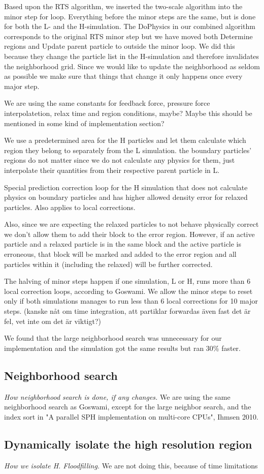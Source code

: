 \documentclass[../../main.tex]{subfiles}
\begin{document}
Based upon the RTS algorithm, we inserted the two-scale algorithm into the minor step for loop. Everything before the minor steps are the same, but is done for both the L- and the H-simulation. The DoPhysics in our combined algorithm corresponds to the original RTS minor step but we have moved both Determine regions and Update parent particle to outside the minor loop. We did this because they change the particle list in the H-simulation and therefore invalidates the neighborhood grid. Since we would like to update the neighborhood as seldom as possible we make sure that things that change it only happens once every major step. 

We are using the same constants for feedback force, pressure force interpolatetion, relax time and region conditions, maybe? Maybe this should be mentioned in some kind of implementation section?

We use a predetermined area for the H particles and let them calculate which region they belong to separately from the L simulation. the boundary particles' regions do not matter since we do not calculate any physics for them, just interpolate their quantities from their respective parent particle in L. 

Special prediction correction loop for the H simulation that does not calculate physics on boundary particles and has higher allowed density error for relaxed particles. Also applies to local corrections. 

Also, since we are expecting the relaxed particles to not behave physically correct we don't allow them to add their block to the error region. However, if an active particle and a relaxed particle is in the same block and the active particle is erroneous, that block will be marked and added to the error region and all particles within it (including the relaxed) will be further corrected. 

The halving of minor steps happen if one simulation, L or H, runs more than 6 local correction loops, according to Goswami. We allow the minor steps to reset only if both simulations manages to run less than 6 local corrections for 10 major steps. (kanske nåt om time integration, att partiklar forwardas även fast det är fel, vet inte om det är viktigt?)

We found that the large neighborhood search was unnecessary for our implementation and the simulation got the same results but ran 30\% faster. 

\subsection{Neighborhood search}
\textit{How neighborhood search is done, if any changes.}
We are using the same neighborhood search as Goswami, except for the large neighbor search, and the index sort in "A parallel SPH implementation on multi-core CPUs", Ihmsen 2010. 

\subsection{Dynamically isolate the high resolution region}
\textit{How we isolate H. Floodfilling.}
We are not doing this, because of time limitations
\end{document}
